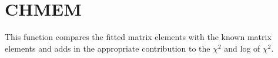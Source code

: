 \section{CHMEM}
\label{sect:chmem}

\noindent This function compares the fitted matrix elements with the known
matrix elements and adds in the appropriate contribution to the $\chi^2$ and
log of $\chi^2$.\\
